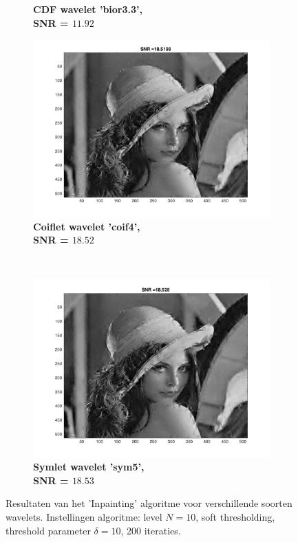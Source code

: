 \begin{figure}
\begin{subfigure}[b]{0.45\textwidth}
        \caption{\textbf{ CDF wavelet 'bior3.3', \\ SNR = $\mathbf{11.92}$} }
        \label{fig:matti_fig_bior33}
    \end{subfigure}
        \begin{subfigure}[b]{0.45\textwidth}
        \includegraphics[width=\textwidth]{../src/inpainting/vrag_2_4_coif4}
        \caption{\textbf{ Coiflet wavelet 'coif4', \\ SNR = $\mathbf{18.52}$} }
        \label{fig:matti_fig_coif4}
    \end{subfigure}
    ~ %
    \begin{subfigure}[b]{0.45\textwidth}
        \includegraphics[width=\textwidth]{../src/inpainting/vraag_2_4_sym5}
        \caption{\textbf{ Symlet wavelet 'sym5', \\ SNR = $\mathbf{18.53}$} }
        \label{fig:matti_fig_sym5}
    \end{subfigure}
    \caption{Resultaten van het 'Inpainting' algoritme voor verschillende soorten wavelets. Instellingen algoritme: level $N = 10$, soft thresholding, threshold parameter $\delta = 10$, 200 iteraties.}\label{fig:matti_fig_5}
\end{figure}
